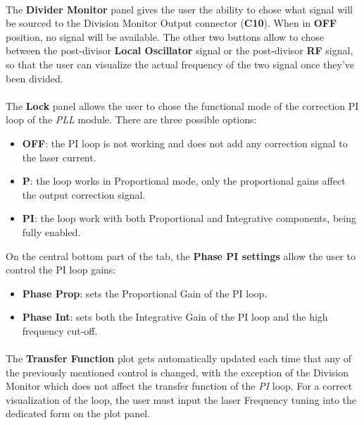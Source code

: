 \paragraph{}The \textbf{Divider Monitor} panel gives the user the ability to chose what signal will be sourced to the Division Monitor Output connector (\textbf{C10}). When in \textbf{OFF} position, no signal will be available. The other two buttons allow to chose between the post-divisor \textbf{Local Oscillator} signal or the post-divisor \textbf{RF} signal, so that the user can visualize the actual frequency of the two signal once they've been divided.

\paragraph{} The \textbf{Lock} panel allows the user to chose the functional mode of the correction PI loop of the \textit{PLL} module. There are three possible options:
\begin{itemize}
    \item \textbf{OFF}: the PI loop is not working and does not add any correction signal to the laser current.
    \item \textbf{P}: the loop works in Proportional mode, only the proportional gains affect the output correction signal.
    \item \textbf{PI}: the loop work with both Proportional and Integrative components, being fully enabled.
\end{itemize}

On the central bottom part of the tab, the \textbf{Phase PI settings} allow the user to control the PI loop gains:
\begin{itemize}
    \item \textbf{Phase Prop}: sets the Proportional Gain of the PI loop.
    \item \textbf{Phase Int}: sets both the Integrative Gain of the PI loop and the high frequency cut-off.
\end{itemize}

\paragraph{}The \textbf{Transfer Function} plot gets automatically updated each time that any of the previously mentioned control is changed, with the exception of the Division Monitor which does not affect the transfer function of the \textit{PI} loop. For a correct visualization of the loop, the user must input the laser Frequency tuning into the dedicated form on the plot panel.

